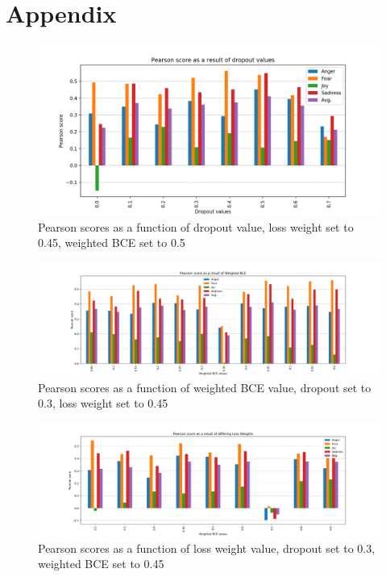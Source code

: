 
\section{Appendix}
\begin{figure}[H]
    \centering
        \includegraphics[width=\textwidth]{pictures/dropoutvalues.png}
        \caption{Pearson scores as a function of dropout value, loss weight set to 0.45, weighted BCE set to 0.5}
        \label{fig:dropoutvalues}
\end{figure}

\begin{figure}[H]
    \centering
        \includegraphics[width=\textwidth]{pictures/weightedBCEvalues.png}
        \caption{Pearson scores as a function of weighted BCE value, dropout set to 0.3, loss weight set to 0.45}
        \label{fig:BCEvalues}
\end{figure}

\begin{figure}[H]
    \centering
        \includegraphics[width=\textwidth]{pictures/LossWeightsvalues.png}
        \caption{Pearson scores as a function of loss weight value, dropout set to 0.3, weighted BCE set to 0.45}
        \label{fig:LWvalues}
\end{figure}
